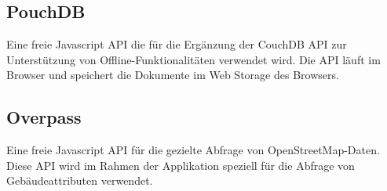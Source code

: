 \subsection{PouchDB}
\label{subsec:pouchdb}
Eine freie Javascript API die für die Ergänzung der CouchDB API zur Unterstützung von Offline-Funktionalitäten verwendet wird. Die API läuft im Browser und speichert die Dokumente im Web Storage des Browsers.

\subsection{Overpass}
\label{subsec:overpass}
Eine freie Javascript API für die gezielte Abfrage von OpenStreetMap-Daten. Diese API wird im Rahmen der Applikation speziell für die Abfrage von Gebäudeattributen verwendet.

